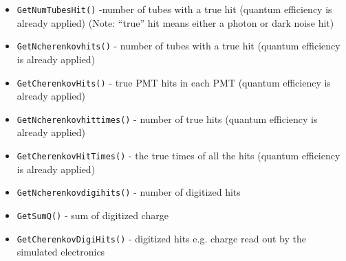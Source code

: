 \begin{description}
\begin{description}
\begin{itemize}
    \item \texttt{GetNumTubesHit()}  -number of tubes with a true hit (quantum efficiency is already applied) (Note: ``true'' hit means either a photon or dark noise hit)
    \item \texttt{GetNcherenkovhits()} - number of tubes with a true hit (quantum efficiency is already applied) 
    \item \texttt{GetCherenkovHits()} - true PMT hits in each PMT (quantum efficiency is already applied)
    \item \texttt{GetNcherenkovhittimes()} - number of true hits (quantum efficiency is already applied)
    \item \texttt{GetCherenkovHitTimes()} - the true times of all the hits (quantum efficiency is already applied)

    \item \texttt{GetNcherenkovdigihits()} - number of digitized hits
    \item \texttt{GetSumQ()} - sum of digitized charge
    \item \texttt{GetCherenkovDigiHits()} - digitized hits e.g. charge read out by the simulated electronics 
    \end{itemize}


\end{description}
\end{description}
